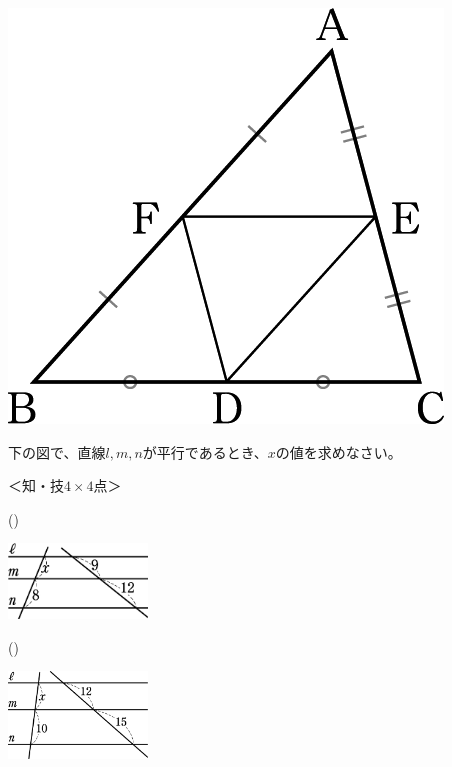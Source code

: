 \documentclass[
  12pt,a4paper,lualatex,ja=standard]{bxjsarticle}
\begin{document}
\begin{flushleft}
\begin{multicols}{2}
\columnbreak

\def\@captype{figure}
\includegraphics{image142.png}


\end{multicols}

\vfill

\setcounter{skaunta}{0}

\noindent{} \hspace{1pt}下の図で、直線$l, m, n$が平行であるとき、$x$の値を求めなさい。

%
\begin{flushright}%
\footnotesize{＜知・技$4\times 4$点＞}%
\end{flushright}%


\begin{multicols}{2}
()\hspace{2.5pt}

\def\@captype{figure}
\includegraphics[width=10em]{toi1.jpg}


\columnbreak

()\hspace{2.5pt}

\def\@captype{figure}
\includegraphics[width=10em]{toi2.jpg}



\end{multicols}
\end{flushleft}
\end{document}
